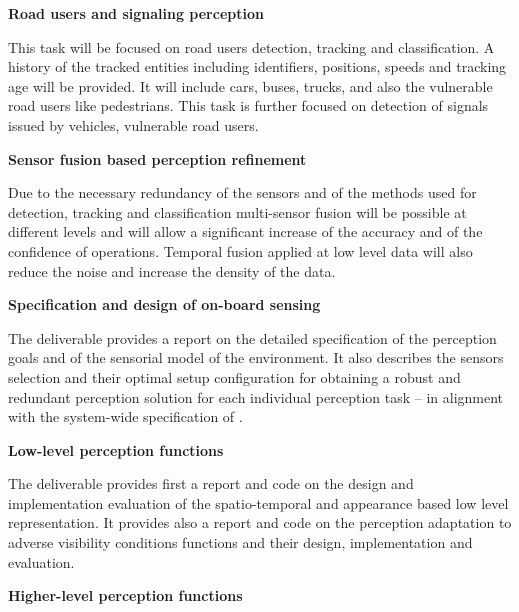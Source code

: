 {\begin{tasks}{\WPPerceptionNo}
\item  {\bf Road users and signaling perception}
      \label{task:wpper:roadu}

This task will be focused on road users detection, tracking and classification. A history of the tracked entities including identifiers, positions, speeds and tracking age will be provided. It will include cars, buses, trucks, and also the vulnerable road users like pedestrians. This task is further focused on detection of signals issued by vehicles, vulnerable road users.

\item  {\bf Sensor fusion based perception refinement}
  \taskpartners{\VW}{\CLUJ}
      \label{task:wpper:sfusion}
  
Due to the necessary redundancy of the sensors and of the methods used for detection, tracking and classification multi-sensor fusion will be possible at different levels and will allow a significant increase of the accuracy and of the confidence of operations. Temporal fusion applied at low level data will also reduce the noise and increase the density of the data.

\end{tasks}


\begin{deliverables}{\WPPerceptionNo}

\item {\bf Specification and design of on-board sensing} 
	\delresponsible{\CLUJ}
	
The deliverable provides a report on the detailed specification of the perception goals and of the sensorial model of the environment. It also describes the sensors selection and their optimal setup configuration for obtaining a robust and redundant perception solution for each individual perception task -- in alignment with the system-wide specification of \WPSpecification. 

\item {\bf Low-level perception functions} 
   \delresponsible{\CLUJ}
   
The deliverable provides first a report and code on the design and implementation evaluation of the spatio-temporal and appearance based low level representation. It provides also a report and code on the perception adaptation to adverse visibility conditions functions and their design, implementation and evaluation.

\item {\bf Higher-level perception functions} 
   \delresponsible{\CLUJ, \PRAGUE, \VW}
   

\end{deliverables}}
